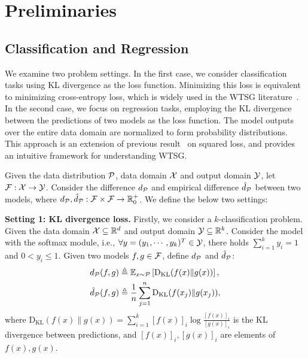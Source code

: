 \section{Preliminaries}


\subsection{Classification and Regression} \label{prelim_class_regress}

We examine two problem settings.
In the first case, we consider classification tasks using KL divergence as the loss function. Minimizing this loss is equivalent to minimizing cross-entropy loss, which is widely used in the WTSG literature~\citep{burns2023weak}. 
In the second case, we focus on regression tasks, employing the KL divergence between the predictions of two models as the loss function. 
The model outputs over the entire data domain are normalized to form probability distributions.
This approach is an extension of previous result~\citep{charikar2024quantifying} on squared loss, and provides an intuitive framework for understanding WTSG.

Given the data distribution $\mathcal{P}$, data domain $\mathcal{X}$ and output domain $\mathcal{Y}$, let $\mathcal{F}: \mathcal{X} \to \mathcal{Y}$.
Consider the difference $d_\mathcal{P}$ and empirical difference $\hat{d}_\mathcal{P}$ between two models, where $d_\mathcal{P},\hat{d}_\mathcal{P}: \mathcal{F} \times \mathcal{F} \to \mathbb{R}_0^+$. We define the below two settings:

\noindent \textbf{Setting 1: KL divergence loss.}
Firstly, we consider a $k$-classification problem.
Given the data domain $\mathcal{X} \subseteq \mathbb{R}^d$ and output domain $\mathcal{Y} \subseteq \mathbb{R}^k$. Consider the model with the softmax module, i.e., $\forall y = (y_1, \cdots, y_k)^T \in \mathcal{Y}$, there holds $\sum_{i=1}^k y_i=1$ and $0 < y_i \le 1$.
Given two models $f,g \in \mathcal{F}$,
define $d_\mathcal{P}$ and $\hat{d}_\mathcal{P}$:
\begin{align}
& d_\mathcal{P}(f,g) \triangleq \mathbb{E}_{x \sim \mathcal{P}} \left[ \mathrm{D}_{\mathrm{KL}}(f(x) \| g(x)) \right], \\ \label{def:cross_entropy}
& \hat{d}_\mathcal{P}(f,g) \triangleq \frac{1}{n} \sum_{j=1}^n \mathrm{D}_{\mathrm{KL}}(f(x_j) \| g(x_j)),  
\end{align}
where $\mathrm{D}_{\mathrm{KL}}(f(x) \| g(x)) = \sum_{i=1}^k [f(x)]_i \log \frac{[f(x)]_i}{[g(x)]_i}$ is the KL divergence between predictions, and $[f(x)]_i, [g(x)]_i$ are elements of $f(x), g(x)$. 



